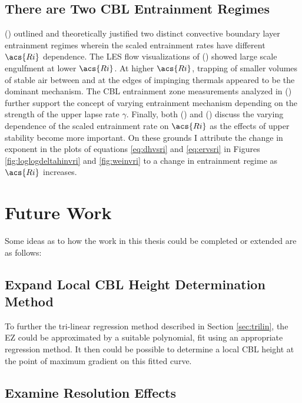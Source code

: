 \subsection{There are Two \acs{CBL} Entrainment Regimes}

\citeauthor{Turner86} (\citeyear{Turner86}) outlined and theoretically justified two distinct convective boundary layer entrainment regimes wherein the scaled entrainment rates have different $\acs{Ri}$ dependence. The \acs{LES} flow visualizations of \citeauthor{SullMoengStev} (\citeyear{SullMoengStev}) showed large scale engulfment at lower $\acs{Ri}$.  At higher $\acs{Ri}$, trapping of smaller volumes of stable air between and at the edges of impinging thermals appeared to be the dominant mechanism. The \acs{CBL} entrainment zone measurements analyzed in \citeauthor{Traum11} (\citeyear{Traum11}) further support the concept of varying entrainment mechanism depending on the strength of the upper lapse rate $\gamma$.  Finally, both \citeauthor{FedConzMir04} (\citeyear{FedConzMir04})  and \citeauthor{GarciaMellado} (\citeyear{GarciaMellado}) discuss the varying dependence of the scaled entrainment rate on $\acs{Ri}$ as the effects of upper stability become more important.  On these grounds I attribute the change in exponent in the plots of equations \ref{eq:dhvsri} and \ref{eq:ervsri} in Figures \ref{fig:loglogdeltahinvri} and \ref{fig:weinvri} to a change in entrainment regime as $\acs{Ri}$ increases.   


\section{Future Work}

Some ideas as to how the work in this thesis could be completed or extended are as follows:

\subsection{Expand Local \acs{CBL} Height Determination Method}

To further the tri-linear regression method described in Section \ref{sec:trilin}, the \acs{EZ} could be approximated by a suitable polynomial, fit using an appropriate regression method.  It then could be possible to determine a local \acs{CBL} height at the point of maximum gradient on this fitted curve.\\

\subsection{Examine Resolution Effects}

